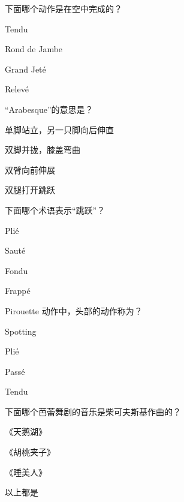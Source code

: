 \documentclass{exam-zh}
\begin{document}
    \begin{question}[points = 2]
    下面哪个动作是在空中完成的？
    \begin{choices}
    \item Tendu
    \item Rond de Jambe
    \item Grand Jeté
    \item Relevé
    \end{choices}
    \end{question}
    
    \begin{question}[points = 2]
    “Arabesque”的意思是？
    \begin{choices}
    \item 单脚站立，另一只脚向后伸直
    \item 双脚并拢，膝盖弯曲
    \item 双臂向前伸展
    \item 双腿打开跳跃
    \end{choices}
    \end{question}
    
    \begin{question}[points = 2]
    下面哪个术语表示“跳跃”？
    \begin{choices}
    \item Plié
    \item Sauté
    \item Fondu
    \item Frappé
    \end{choices}
    \end{question}
    
    \begin{question}[points = 2]
    Pirouette 动作中，头部的动作称为？
    \begin{choices}
    \item Spotting
    \item Plié
    \item Passé
    \item Tendu
    \end{choices}
    \end{question}
    
    \begin{question}[points = 2]
    下面哪个芭蕾舞剧的音乐是柴可夫斯基作曲的？
    \begin{choices}
    \item 《天鹅湖》
    \item 《胡桃夹子》
    \item 《睡美人》
    \item 以上都是
    \end{choices}
    \end{question}
    
\end{document}
